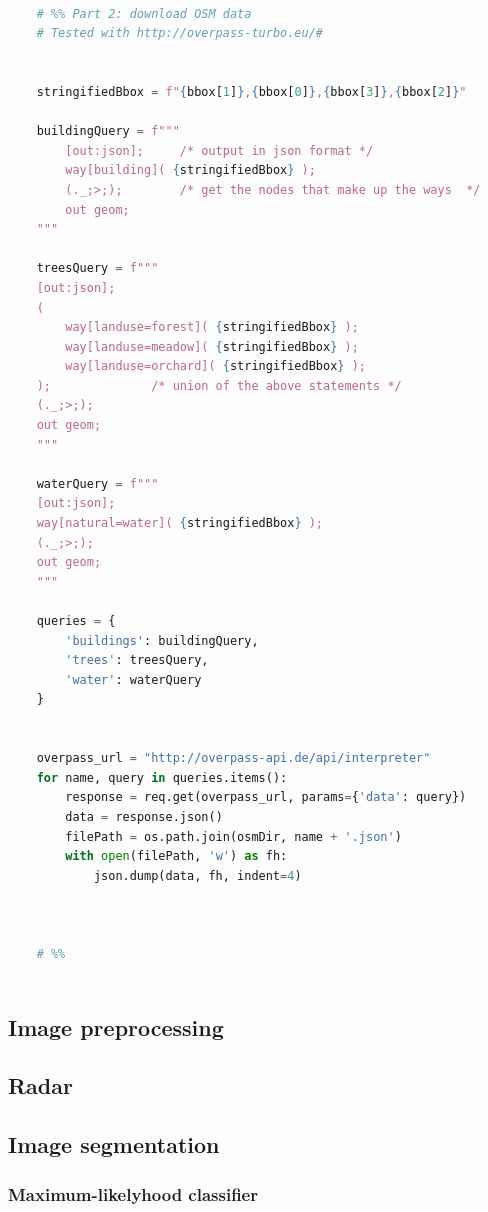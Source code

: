 \begin{lstlisting}[language=python]
    
    # %% Part 2: download OSM data
    # Tested with http://overpass-turbo.eu/#
    
    
    stringifiedBbox = f"{bbox[1]},{bbox[0]},{bbox[3]},{bbox[2]}"
    
    buildingQuery = f"""
        [out:json];     /* output in json format */
        way[building]( {stringifiedBbox} );
        (._;>;);        /* get the nodes that make up the ways  */
        out geom;
    """
    
    treesQuery = f"""
    [out:json];
    (
        way[landuse=forest]( {stringifiedBbox} );
        way[landuse=meadow]( {stringifiedBbox} );
        way[landuse=orchard]( {stringifiedBbox} );
    );              /* union of the above statements */
    (._;>;);
    out geom;
    """
    
    waterQuery = f"""
    [out:json];
    way[natural=water]( {stringifiedBbox} );
    (._;>;);
    out geom;
    """
    
    queries = {
        'buildings': buildingQuery,
        'trees': treesQuery,
        'water': waterQuery
    }
    
    
    overpass_url = "http://overpass-api.de/api/interpreter"
    for name, query in queries.items():
        response = req.get(overpass_url, params={'data': query})
        data = response.json()
        filePath = os.path.join(osmDir, name + '.json')
        with open(filePath, 'w') as fh:
            json.dump(data, fh, indent=4)
    
    
    
    # %%
    
\end{lstlisting}


\subsection{Image preprocessing}
\subsubsection{}
\subsection{Radar}
\subsection{Image segmentation}
\subsubsection{Maximum-likelyhood classifier}

